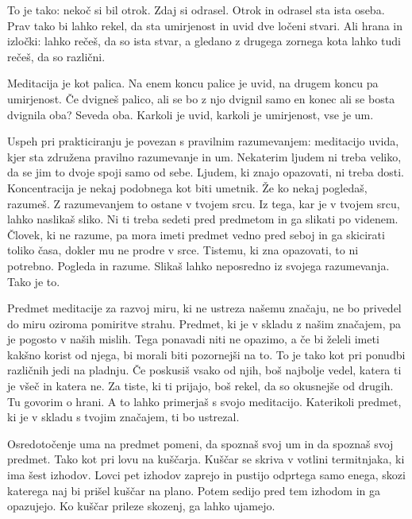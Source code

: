 To je tako: nekoč si bil otrok. Zdaj si odrasel. Otrok in odrasel sta ista oseba. Prav tako bi lahko rekel, da sta umirjenost in uvid dve ločeni stvari. Ali hrana in izločki: lahko rečeš, da so ista stvar, a gledano z drugega zornega kota lahko tudi rečeš, da so različni.

\clearpage


Meditacija je kot palica. Na enem koncu palice je uvid, na drugem koncu pa umirjenost. Če dvigneš palico, ali se bo z njo dvignil samo en konec ali se bosta dvignila oba? Seveda oba. Karkoli je uvid, karkoli je umirjenost, vse je um.


Uspeh pri prakticiranju je povezan s pravilnim razumevanjem: meditacijo uvida, kjer sta združena pravilno razumevanje in um. Nekaterim ljudem ni treba veliko, da se jim to dvoje spoji samo od sebe. Ljudem, ki znajo opazovati, ni treba dosti. Koncentracija je nekaj podobnega kot biti umetnik. Že ko nekaj pogledaš, razumeš. Z razumevanjem to ostane v tvojem srcu. Iz tega, kar je v tvojem srcu, lahko naslikaš sliko. Ni ti treba sedeti pred predmetom in ga slikati po videnem. Človek, ki ne razume, pa mora imeti predmet vedno pred seboj in ga skicirati toliko časa, dokler mu ne prodre v srce. Tistemu, ki zna opazovati, to ni potrebno. Pogleda in razume. Slikaš lahko neposredno iz svojega razumevanja. Tako je to.

\clearpage


Predmet meditacije za razvoj miru, ki ne ustreza našemu značaju, ne bo privedel do miru oziroma pomiritve strahu. Predmet, ki je v skladu z našim značajem, pa je pogosto v naših mislih. Tega ponavadi niti ne opazimo, a če bi želeli imeti kakšno korist od njega, bi morali biti pozornejši na to. To je tako kot pri ponudbi različnih jedi na pladnju. Če poskusiš vsako od njih, boš najbolje vedel, katera ti je všeč in katera ne. Za tiste, ki ti prijajo, boš rekel, da so okusnejše od drugih. Tu govorim o hrani. A to lahko primerjaš s svojo meditacijo. Katerikoli predmet, ki je v skladu s tvojim značajem, ti bo ustrezal.

\clearpage


Osredotočenje uma na predmet pomeni, da spoznaš svoj um in da spoznaš svoj predmet. Tako kot pri lovu na kuščarja. Kuščar se skriva v votlini termitnjaka, ki ima šest izhodov. Lovci pet izhodov zaprejo in pustijo odprtega samo enega, skozi katerega naj bi prišel kuščar na plano. Potem sedijo pred tem izhodom in ga opazujejo. Ko kuščar prileze skozenj, ga lahko ujamejo.


